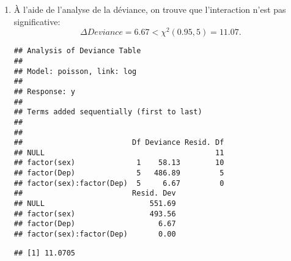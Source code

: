 \begin{solution}{6.5}
\begin{enumerate}
\item À l'aide de l'analyse de la déviance, on trouve que l'interaction n'est pas significative:
$$\Delta Deviance = 6.67 < \chi^2 (0.95,5) = 11.07.$$
\begin{knitrout}
\color{fgcolor}\begin{kframe}
\begin{alltt}
 \hlkwb{<-} \hlopt{~}\hlopt{*}\hlopt{+}\hlstd{(}
\end{alltt}
\begin{verbatim}
## Analysis of Deviance Table
##
## Model: poisson, link: log
##
## Response: y
##
## Terms added sequentially (first to last)
##
##
##                         Df Deviance Resid. Df
## NULL                                       11
## factor(sex)              1    58.13        10
## factor(Dep)              5   486.89         5
## factor(sex):factor(Dep)  5     6.67         0
##                         Resid. Dev
## NULL                        551.69
## factor(sex)                 493.56
## factor(Dep)                   6.67
## factor(sex):factor(Dep)       0.00
\end{verbatim}
\begin{alltt}
\hlstd{(}\hlstd{,}\hlstd{)} 
\end{alltt}
\begin{verbatim}
## [1] 11.0705
\end{verbatim}
\end{kframe}
\end{knitrout}


\end{enumerate}
\end{solution}
